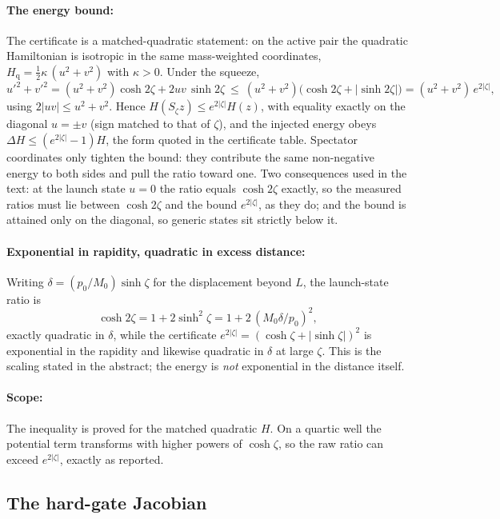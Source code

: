 \documentclass{article}
\newcommand{\half}{\tfrac12}
\begin{document}
\paragraph{The energy bound:}
The certificate is a matched-quadratic statement: on the active pair the quadratic Hamiltonian is isotropic in the same mass-weighted coordinates, $H_{\mathrm q}=\half\kappa\,(u^2+v^2)$ with $\kappa>0$. Under the squeeze,
\[
u'^2+v'^2=(u^2+v^2)\cosh2\zeta+2uv\,\sinh2\zeta
\ \le\ (u^2+v^2)\bigl(\cosh2\zeta+|\sinh2\zeta|\bigr)
=(u^2+v^2)\,e^{2|\zeta|},
\]
using $2|uv|\le u^2+v^2$. Hence $H(S_\zeta z)\le e^{2|\zeta|}H(z)$, with equality exactly on the diagonal $u=\pm v$ (sign matched to that of $\zeta$), and the injected energy obeys $\Delta H\le(e^{2|\zeta|}-1)H$, the form quoted in the certificate table. Spectator coordinates only tighten the bound: they contribute the same non-negative energy to both sides and pull the ratio toward one. Two consequences used in the text: at the launch state $u=0$ the ratio equals $\cosh2\zeta$ exactly, so the measured ratios must lie between $\cosh2\zeta$ and the bound $e^{2|\zeta|}$, as they do; and the bound is attained only on the diagonal, so generic states sit strictly below it.

\paragraph{Exponential in rapidity, quadratic in excess distance:}
Writing $\delta=(p_0/M_0)\sinh\zeta$ for the displacement beyond $L$, the launch-state ratio is
\[
\cosh2\zeta=1+2\sinh^2\zeta=1+2\,(M_0\delta/p_0)^2,
\]
exactly quadratic in $\delta$, while the certificate $e^{2|\zeta|}=(\cosh\zeta+|\sinh\zeta|)^2$ is exponential in the rapidity and likewise quadratic in $\delta$ at large $\zeta$. This is the scaling stated in the abstract; the energy is \emph{not} exponential in the distance itself.

\paragraph{Scope:}
The inequality is proved for the matched quadratic $H$. On a quartic well the potential term transforms with higher powers of $\cosh\zeta$, so the raw ratio can exceed $e^{2|\zeta|}$, exactly as reported.

\subsection{The hard-gate Jacobian}
\label{app:deriv:gate}
\end{document}
